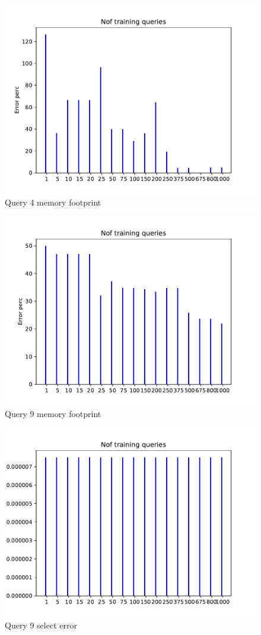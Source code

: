 \begin{figure}[ht]
  \centering
  \includegraphics[scale=0.7]{figs/airtraffic/airtraffic_q4_memerror.pdf}
  \caption{Query 4 memory footprint}
  \label{fig:sel6}
\end{figure}


\begin{figure}[ht]
  \centering
  \includegraphics[scale=0.7]{figs/airtraffic/airtraffic_sel9_error.pdf}
  \caption{Query 9 memory footprint}
  \label{fig:sel6}
\end{figure}

\begin{figure}[ht]
  \centering
  \includegraphics[scale=0.7]{figs/airtraffic/airtraffic_q9_memerror.pdf}
  \caption{Query 9 select error}
  \label{fig:sel6}
\end{figure}


